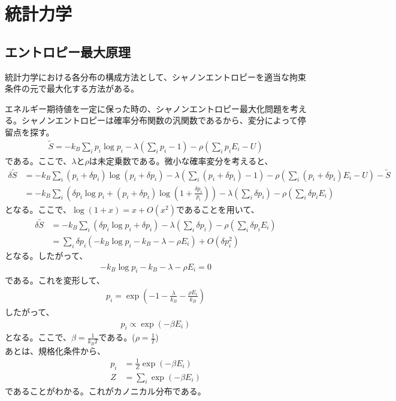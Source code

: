 \documentclass[a4paper,11pt]{jsarticle}
\numberwithin{equation}{section}
\begin{document}
\section{統計力学}
\subsection{エントロピー最大原理}
統計力学における各分布の構成方法として、シャノンエントロピーを適当な拘束条件の元で最大化する方法がある。

エネルギー期待値を一定に保った時の、シャノンエントロピー最大化問題を考える。シャノンエントロピーは確率分布関数の汎関数であるから、変分によって停留点を探す。
\begin{align}
  \tilde{S}= -k_B\sum_{i}p_i\log p_i -\lambda\left(\sum_{i}p_i - 1\right)-\rho\left(\sum_{i}p_iE_i - U\right)  
\end{align}
である。ここで、$\lambda$と$\rho$は未定乗数である。微小な確率変分を考えると、
\begin{align}
  \delta \tilde{S} &= -k_B\sum_{i}(p_i + \delta p_i)\log (p_i + \delta p_i) -\lambda\left(\sum_{i}(p_i + \delta p_i)- 1\right) -\rho\left(\sum_{i}(p_i + \delta p_i)E_i - U\right)-\tilde{S}\\
  &= -k_B\sum_{i}\left(\delta p_i\log p_i + (p_i + \delta p_i)\log \left(1 + \frac{\delta p_i}{p_i}\right)\right)  -\lambda\left(\sum_{i}\delta p_i\right)-\rho\left(\sum_{i}\delta p_iE_i\right)
\end{align}
となる。ここで、$\log(1+x) = x + O(x^2)$であることを用いて、
\begin{align}
  \delta \tilde{S} &= -k_B\sum_{i}\left(\delta p_i\log p_i + \delta p_i\right)  -\lambda\left(\sum_{i}\delta p_i\right)-\rho\left(\sum_{i}\delta p_iE_i\right)\\
  &= \sum_{i}\delta p_i\left(-k_B\log p_i - k_B - \lambda - \rho E_i\right) + O(\delta p_i^2)
\end{align}
となる。したがって、
\begin{align}
  -k_B\log p_i - k_B - \lambda - \rho E_i = 0
\end{align}
である。これを変形して、
\begin{align}
  p_i = \exp(-1-\frac{\lambda}{k_B}-\frac{\rho E_i}{k_B})
\end{align}
したがって、
\begin{align}
  p_i \propto \exp(-\beta E_i)
\end{align}
となる。ここで、$\beta = \frac{1}{k_B T}$である。($\rho = \frac{1}{T}$)\\
あとは、規格化条件から、
\begin{align}
    p_i &= \frac{1}{Z} \exp(-\beta E_i)\\
    Z &= \sum_{i} \exp(-\beta E_i)
\end{align}
であることがわかる。これがカノニカル分布である。\\
\end{document}
